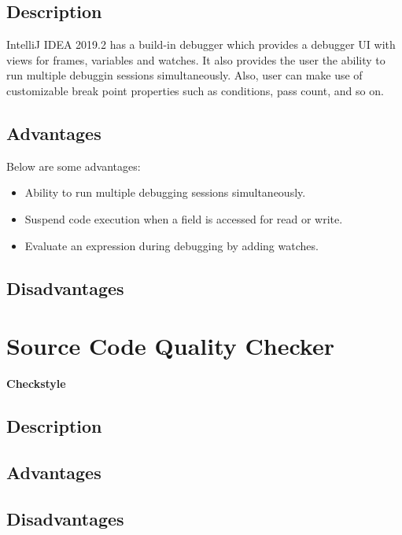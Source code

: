 \documentclass[a4paper,12pt]{article}
\begin{document}
\subsection{Description}
IntelliJ IDEA 2019.2 has a build-in debugger which provides a debugger UI with views for frames, variables and watches. It also provides the user the ability to run multiple debuggin sessions simultaneously. Also, user can make use of customizable break point properties such as conditions, pass count, and so on. 

\subsection{Advantages}
Below are some advantages:
\begin{itemize}
	\item Ability to run multiple debugging sessions simultaneously.
	\item Suspend code execution when a field is accessed for read or write.
	\item Evaluate an expression during debugging by adding watches.
\end{itemize}

\subsection{Disadvantages}


\newpage

\section{\large Source Code Quality Checker}
\textbf{Checkstyle}

\subsection{Description}


\subsection{Advantages}

\subsection{Disadvantages}
\end{document}

